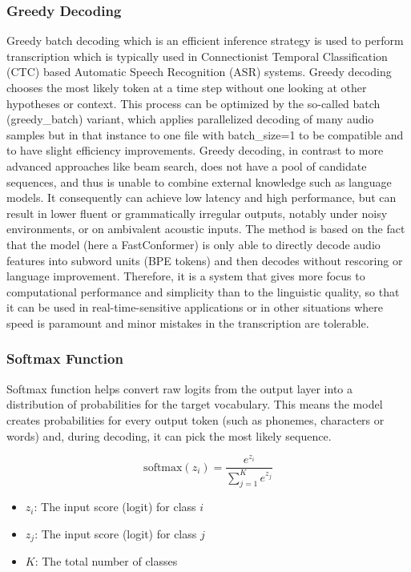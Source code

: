 \subsubsection{Greedy Decoding}
Greedy batch decoding which is an efficient inference strategy is used to perform transcription which is typically used in Connectionist Temporal Classification (CTC) based Automatic Speech Recognition (ASR) systems. Greedy decoding chooses the most likely token at a time step without one looking at other hypotheses or context. This process can be optimized by the so-called batch (greedy\_batch) variant, which applies parallelized decoding of many audio samples but in that instance to one file with batch\_size=1 to be compatible and to have slight efficiency improvements.
Greedy decoding, in contrast to more advanced approaches like beam search, does not have a pool of candidate sequences, and thus is unable to combine external knowledge such as language models. It consequently can achieve low latency and high performance, but can result in lower fluent or grammatically irregular outputs, notably under noisy environments, or on ambivalent acoustic inputs. The method is based on the fact that the model (here a FastConformer) is only able to directly decode audio features into subword units (BPE tokens) and then decodes without rescoring or language improvement.
Therefore, it is a system that gives more focus to computational performance and simplicity than to the linguistic quality, so that it can be used in real-time-sensitive applications or in other situations where speed is paramount and minor mistakes in the transcription are tolerable.

\subsubsection{Softmax Function}
Softmax function helps convert raw logits from the output layer into a distribution of probabilities for the target vocabulary. This means the model creates probabilities for every output token (such as phonemes, characters or words) and, during decoding, it can pick the most likely sequence.

\begin{equation}
\text{softmax}(z_i) = \frac{e^{z_i}}{\sum_{j=1}^{K} e^{z_j}}
\end{equation}

\begin{itemize}
  \item \( z_i \): The input score (logit) for class \( i \)
  \item \( z_j \): The input score (logit) for class \( j \)
  \item \( K \): The total number of classes
\end{itemize}

